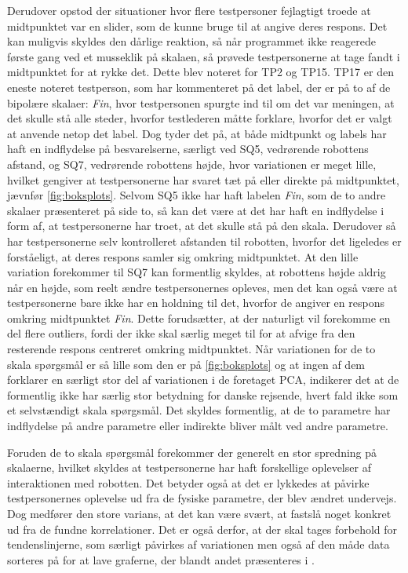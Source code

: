 Derudover opstod der situationer hvor flere testpersoner fejlagtigt troede at midtpunktet var en slider, som de kunne bruge til at angive deres respons. Det kan muligvis skyldes den dårlige reaktion, så når programmet ikke reagerede første gang ved et musseklik på skalaen, så prøvede testpersonerne at tage fandt i midtpunktet for at rykke det. Dette blev noteret for TP2 og TP15.\blankline 
%
TP17 er den eneste noteret testperson, som har kommenteret på det label, der er på to af de bipolære skalaer: \textit{Fin}, hvor testpersonen spurgte ind til om det var meningen, at det skulle stå alle steder, hvorfor testlederen måtte forklare, hvorfor det er valgt at anvende netop det label. Dog tyder det på, at både midtpunkt og labels har haft en indflydelse på besvarelserne, særligt ved SQ5, vedrørende robottens afstand, og SQ7, vedrørende robottens højde, hvor variationen er meget lille, hvilket gengiver at testpersonerne har svaret tæt på eller direkte på midtpunktet, jævnfør \autoref{fig:boksplots}. Selvom SQ5 ikke har haft labelen \textit{Fin}, som de to andre skalaer præsenteret på side to, så kan det være at det har haft en indflydelse i form af, at testpersonerne har troet, at det skulle stå på den skala. Derudover så har testpersonerne selv kontrolleret afstanden til robotten, hvorfor det ligeledes er forståeligt, at deres respons samler sig omkring midtpunktet. At den lille variation forekommer til SQ7 kan formentlig skyldes, at robottens højde aldrig når en højde, som reelt ændre testpersonernes opleves, men det kan også være at testpersonerne bare ikke har en holdning til det, hvorfor de angiver en respons omkring midtpunktet \textit{Fin}. Dette forudsætter, at der naturligt vil forekomme en del flere outliers, fordi der ikke skal særlig meget til for at afvige fra den resterende respons centreret omkring midtpunktet. Når variationen for de to skala spørgsmål er så lille som den er på \autoref{fig:boksplots} og at ingen af dem forklarer en særligt stor del af variationen i de foretaget PCA, indikerer det at de formentlig ikke har særlig stor betydning for danske rejsende, hvert fald ikke som et selvstændigt skala spørgsmål. Det skyldes formentlig, at de to parametre har indflydelse på andre parametre eller indirekte bliver målt ved andre parametre. 

Foruden de to skala spørgsmål forekommer der generelt en stor spredning på skalaerne, hvilket skyldes at testpersonerne har haft forskellige oplevelser af interaktionen med robotten. Det betyder også at det er lykkedes at påvirke testpersonernes oplevelse ud fra de fysiske parametre, der blev ændret undervejs. Dog medfører den store varians, at det kan være svært, at fastslå noget konkret ud fra de fundne korrelationer. Det er også derfor, at der skal tages forbehold for tendenslinjerne, som særligt påvirkes af variationen men også af den måde data sorteres på for at lave graferne, der blandt andet præsenteres i . 
%



